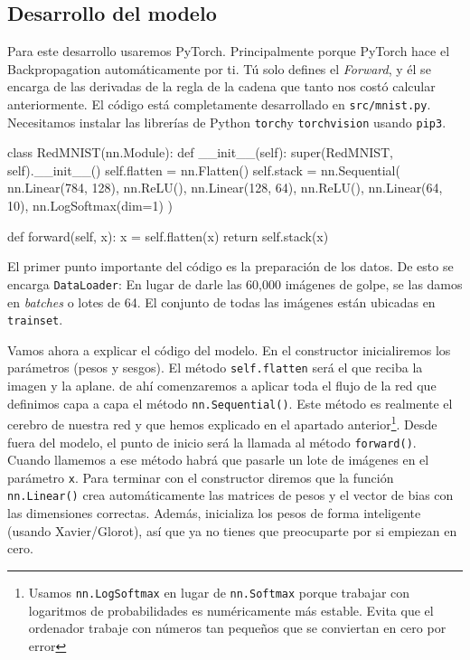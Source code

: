 \documentclass[a4paper,11pt]{article}
\begin{document}
\subsection{Desarrollo del modelo}

Para este desarrollo usaremos PyTorch. Principalmente porque PyTorch
hace el Backpropagation automáticamente por ti. Tú solo defines el
\emph{Forward}, y él se encarga de las derivadas de la regla de la
cadena que tanto nos costó calcular anteriormente. El código está
completamente desarrollado en \texttt{src/mnist.py}. Necesitamos
instalar las librerías de Python \texttt{torch}y \texttt{torchvision}
usando \texttt{pip3}.

\begin{codigo}
class RedMNIST(nn.Module):
    def __init__(self):
        super(RedMNIST, self).__init__()
        self.flatten = nn.Flatten()
        self.stack = nn.Sequential(
            nn.Linear(784, 128),
            nn.ReLU(),
            nn.Linear(128, 64),
            nn.ReLU(),
            nn.Linear(64, 10),
            nn.LogSoftmax(dim=1)
        )

    def forward(self, x):
        x = self.flatten(x)
        return self.stack(x)
\end{codigo}

El primer punto importante del código es la preparación de los datos. De
esto se encarga \texttt{DataLoader}: En lugar de darle las 60,000
imágenes de golpe, se las damos en \emph{batches} o lotes de 64. El
conjunto de todas las imágenes están ubicadas en \texttt{trainset}.

Vamos ahora a explicar el código del modelo. En el constructor
inicialiremos los parámetros (pesos y sesgos). El método
\texttt{self.flatten} será el que reciba la imagen y la aplane. de ahí
comenzaremos a aplicar toda el flujo de la red que definimos capa a capa
el método \texttt{nn.Sequential()}. Este método es realmente el cerebro
de nuestra red y que hemos explicado en el apartado
anterior\footnote{Usamos \texttt{nn.LogSoftmax} en lugar de \texttt{nn.Softmax} porque
trabajar con logaritmos de probabilidades es numéricamente más estable. Evita
que el ordenador trabaje con números tan pequeños que se conviertan en cero por
error}. Desde fuera del modelo, el punto de inicio será la llamada al
método \texttt{forward()}. Cuando llamemos a ese método habrá que
pasarle un lote de imágenes en el parámetro \texttt{x}. Para terminar
con el constructor diremos que la función \texttt{nn.Linear()} crea
automáticamente las matrices de pesos y el vector de bias con las
dimensiones correctas. Además, inicializa los pesos de forma inteligente
(usando Xavier/Glorot), así que ya no tienes que preocuparte por si
empiezan en cero.
\end{document}
